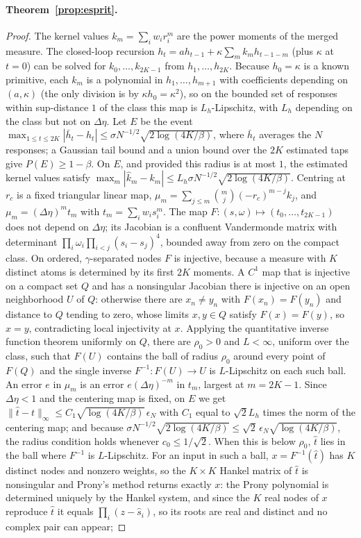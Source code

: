 \documentclass[12pt]{article}
\theoremstyle{definition}
\theoremstyle{remark}
\begin{document}
\paragraph{Theorem~\ref{prop:esprit}.}
\begin{proof}
The kernel values $k_m=\sum_iw_ir_i^m$ are the power moments of the merged measure. The closed-loop recursion $h_t=ah_{t-1}+\kappa\sum_mk_mh_{t-1-m}$ (plus $\kappa$ at $t=0$) can be solved for $k_0,\ldots,k_{2K-1}$ from $h_1,\ldots,h_{2K}$. Because $h_0=\kappa$ is a known primitive, each $k_m$ is a polynomial in $h_1,\ldots,h_{m+1}$ with coefficients depending on $(a,\kappa)$ (the only division is by $\kappa h_0=\kappa^2$), so on the bounded set of responses within sup-distance $1$ of the class this map is $L_h$-Lipschitz, with $L_h$ depending on the class but not on $\Delta\eta$. Let $E$ be the event $\max_{1\le t\le2K}|\bar h_t-h_t|\le\sigma N^{-1/2}\sqrt{2\log(4K/\beta)}$, where $\bar h_t$ averages the $N$ responses; a Gaussian tail bound and a union bound over the $2K$ estimated taps give $P(E)\ge1-\beta$. On $E$, and provided this radius is at most $1$, the estimated kernel values satisfy $\max_m|\hat k_m-k_m|\le L_h\sigma N^{-1/2}\sqrt{2\log(4K/\beta)}$. Centring at $r_c$ is a fixed triangular linear map, $\mu_m=\sum_{j\le m}\binom mj(-r_c)^{m-j}k_j$, and $\mu_m=(\Delta\eta)^m t_m$ with $t_m=\sum_iw_is_i^m$. The map $F:(s,\omega)\mapsto(t_0,\ldots,t_{2K-1})$ does not depend on $\Delta\eta$; its Jacobian is a confluent Vandermonde matrix with determinant $\prod_i\omega_i\prod_{i<j}(s_i-s_j)^4$, bounded away from zero on the compact class. On ordered, $\gamma$-separated nodes $F$ is injective, because a measure with $K$ distinct atoms is determined by its first $2K$ moments. A $C^1$ map that is injective on a compact set $Q$ and has a nonsingular Jacobian there is injective on an open neighborhood $U$ of $Q$: otherwise there are $x_n\ne y_n$ with $F(x_n)=F(y_n)$ and distance to $Q$ tending to zero, whose limits $x,y\in Q$ satisfy $F(x)=F(y)$, so $x=y$, contradicting local injectivity at $x$. Applying the quantitative inverse function theorem uniformly on $Q$, there are $\rho_0>0$ and $L<\infty$, uniform over the class, such that $F(U)$ contains the ball of radius $\rho_0$ around every point of $F(Q)$ and the single inverse $F^{-1}:F(U)\to U$ is $L$-Lipschitz on each such ball. An error $e$ in $\mu_m$ is an error $e(\Delta\eta)^{-m}$ in $t_m$, largest at $m=2K-1$. Since $\Delta\eta<1$ and the centering map is fixed, on $E$ we get $\|\hat t-t\|_\infty\le C_1\sqrt{\log(4K/\beta)}\,\epsilon_N$ with $C_1$ equal to $\sqrt2L_h$ times the norm of the centering map; and because $\sigma N^{-1/2}\sqrt{2\log(4K/\beta)}\le\sqrt2\,\epsilon_N\sqrt{\log(4K/\beta)}$, the radius condition holds whenever $c_0\le1/\sqrt2$. When this is below $\rho_0$, $\hat t$ lies in the ball where $F^{-1}$ is $L$-Lipschitz. For an input in such a ball, $x=F^{-1}(\hat t)$ has $K$ distinct nodes and nonzero weights, so the $K\times K$ Hankel matrix of $\hat t$ is nonsingular and Prony's method returns exactly $x$: the Prony polynomial is determined uniquely by the Hankel system, and since the $K$ real nodes of $x$ reproduce $\hat t$ it equals $\prod_i(z-\hat s_i)$, so its roots are real and distinct and no complex pair can appear; 
\end{proof}
\end{document}

